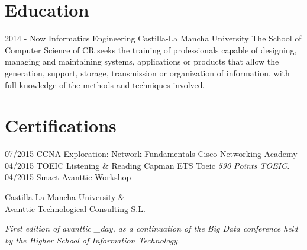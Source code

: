 \documentclass[]{friggeri-cv}
\begin{document}
\section{Education}
\begin{entrylist}
  \entry
    {2014 - Now}
    {Informatics Engineering}
    {Castilla-La Mancha University}
    {The School of Computer Science of CR seeks the training of professionals capable of designing, managing and maintaining systems, applications or products that allow the generation, support, storage, transmission or organization of information, with full knowledge of the methods and techniques involved.}\\
\end{entrylist}

\section{Certifications}
\begin{entrylist}
  \entry
    {07/2015}
    {CCNA Exploration: Network Fundamentals}
    {Cisco Networking Academy}
    {\emph{\\}}
    \entry
    {04/2015}
    {TOEIC Listening \& Reading}
    {Capman ETS Toeic}
    {\emph{590 Points TOEIC.\\}}
    \entry
    {04/2015}
    {Smact Avanttic Workshop}
    {\begin{flushright}Castilla-La Mancha University \& \\Avanttic Technological Consulting S.L.\end{flushright}}
    {\emph{First edition of avanttic \_day, as a continuation of the Big Data conference held by the Higher School of Information Technology.}}
\end{entrylist}
\end{document}

